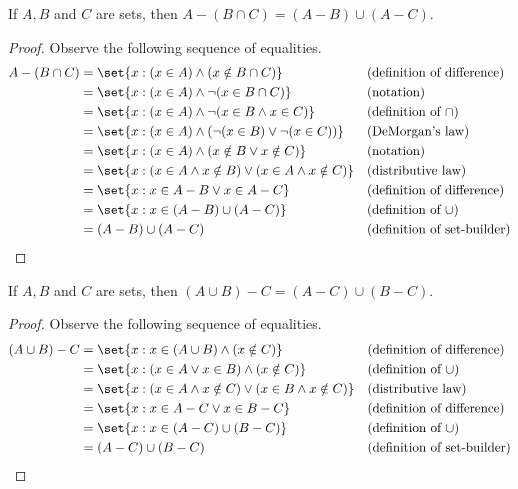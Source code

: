 \documentclass[DIN, pagenumber=false, fontsize=11pt, parskip=half]{scrartcl}
\begin{document}
\begin{problems}
    \problem If $A,B$ and $C$ are sets, then $A - (B \cap C) = (A - B) \cup (A - C)$.
    \begin{proof}
        Observe the following sequence of equalities.
        \begin{align*}
            A - (B \cap C) & = \set{x : (x \in A) \land (x \notin B \cap C)} && \text{(definition of difference)}\\
                           & = \set{x : (x \in A) \land \lnot(x \in B \cap C)} && \text{(notation)}\\
                           & = \set{x : (x \in A) \land \lnot (x \in B \land x \in C)} && \text{(definition of $\cap$)}\\
                           & = \set{x : (x \in A) \land (\lnot(x \in B) \lor \lnot(x \in C))} && \text{(DeMorgan's law)}\\
                           & = \set{x : (x \in A) \land (x \notin B \lor x \notin C)} && \text{(notation)}\\
                           & = \set{x : (x \in A \land x \notin B) \lor (x \in A \land x \notin C)} && \text{(distributive law)}\\
                           & = \set{x : x \in A - B \lor x \in A - C} && \text{(definition of difference)}\\
                           & = \set{x : x \in (A - B) \cup (A - C)} && \text{(definition of $\cup$)}\\
                           & = (A - B) \cup (A - C) && \text{(definition of set-builder)}
        \end{align*}
    \end{proof}

    \problem If $A,B$ and $C$ are sets, then $(A \cup B) - C = (A - C) \cup (B - C)$. 
    \begin{proof}
        Observe the following sequence of equalities.
        \begin{align*}
            (A \cup B) - C & = \set{x : x \in (A \cup B) \land (x \notin C)} && \text{(definition of difference)}\\ 
                           & = \set{x : (x \in A \lor x \in B) \land (x \notin C)} && \text{(definition of $\cup$)}\\ 
                           & = \set{x : (x \in A \land x \notin C) \lor (x \in B \land x \notin C)} && \text{(distributive law)}\\ 
                           & = \set{x : x \in A - C \lor x \in B - C} && \text{(definition of difference)}\\
                           & = \set{x : x \in (A - C) \cup (B - C)} && \text{(definition of $\cup$)}\\
                           & = (A - C) \cup (B - C) && \text{(definition of set-builder)}
        \end{align*}
    \end{proof}


\end{problems}
\end{document}
